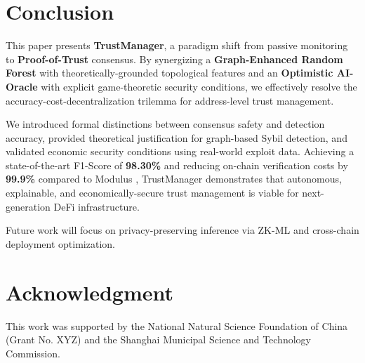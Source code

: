 \documentclass[runningheads]{llncs}
\begin{document}
\section{Conclusion}
This paper presents \textbf{TrustManager}, a paradigm shift from passive monitoring to \textbf{Proof-of-Trust} consensus. By synergizing a \textbf{Graph-Enhanced Random Forest} with theoretically-grounded topological features and an \textbf{Optimistic AI-Oracle} with explicit game-theoretic security conditions, we effectively resolve the accuracy-cost-decentralization trilemma for address-level trust management.

We introduced formal distinctions between consensus safety and detection accuracy, provided theoretical justification for graph-based Sybil detection, and validated economic security conditions using real-world exploit data. Achieving a state-of-the-art F1-Score of \textbf{98.30\%} and reducing on-chain verification costs by \textbf{99.9\%} compared to Modulus \cite{modulus2023cost}, TrustManager demonstrates that autonomous, explainable, and economically-secure trust management is viable for next-generation DeFi infrastructure.

Future work will focus on privacy-preserving inference via ZK-ML and cross-chain deployment optimization.

\section*{Acknowledgment}
This work was supported by the National Natural Science Foundation of China (Grant No. XYZ) and the Shanghai Municipal Science and Technology Commission.



\end{document}
